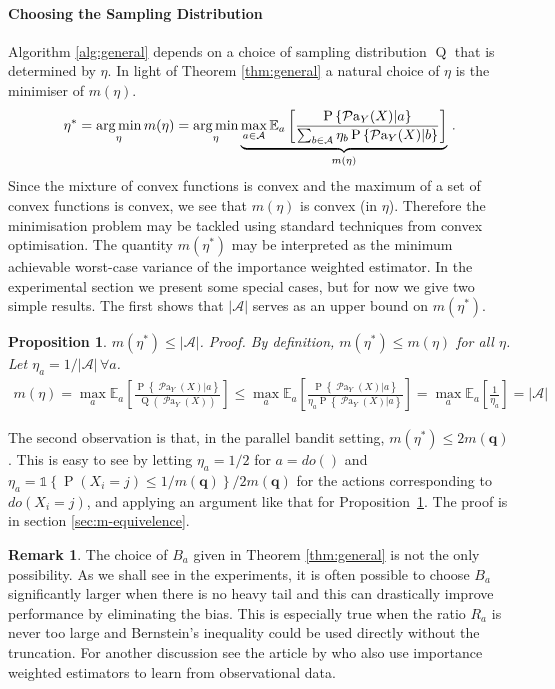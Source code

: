 \documentclass[11pt,a4paper,twoside]{report}
\newcommand{\Q}[1]{\operatorname{Q}\left(#1\right)}
\newcommand{\EE}{\mathbb E}
\newcommand{\EEa}{\EE_a}
\newcommand{\Pn}[2]{\operatorname{P}\left\{#2|#1\right\}}
\newcommand{\calA}{\mathcal A}
\newcommand{\set}[1]{\left\{#1\right\}}
\newcommand{\ind}[1]{\mathds{1}\!\!\set{#1}}
\newcommand{\argmin}{\operatornamewithlimits{arg\,min}}
\newcommand{\eq}[1]{\begin{align*}#1\end{align*}}
\renewcommand{\P}[1]{\operatorname{P}\left(#1\right)}
\newcommand{\parents}[1]{\operatorname{\mathcal{P}a}_{#1}}
\theoremstyle{plain}
\newtheorem{proposition}[theorem]{Proposition}
\theoremstyle{definition}
\newtheorem{remark}[theorem]{Remark}
\begin{document}
\paragraph{Choosing the Sampling Distribution} Algorithm \ref{alg:general} depends on a choice of sampling distribution $\operatorname{Q}$ that is determined by $\eta$. In light of Theorem \ref{thm:general}
a natural choice of $\eta$ is the minimiser of $m(\eta)$.
\eq{
\eta^* 
= \argmin_\eta m(\eta) = \argmin_\eta \underbrace{\max_{a \in \calA} \EEa \left[\frac{\Pn{a}{\parents{Y}(X)}}{\sum_{b \in \calA} \eta_b \Pn{b}{\parents{Y}(X)}}\right]}_{m(\eta)}\,.
}
Since the mixture of convex functions is convex and the maximum of a set of convex functions is convex, we see that $m(\eta)$ is convex (in $\eta$).
Therefore the minimisation problem may be tackled using standard techniques from convex optimisation. The quantity $m(\eta^*)$ may be interpreted as the minimum achievable worst-case variance of the importance weighted estimator. In the experimental section we present some special cases, but for now we give two simple results. The first shows that $|\calA|$ serves as an upper bound on $m(\eta^*)$.

\begin{proposition}\label{pro:m-bound}
$m(\eta^*) \leq |\calA|$. \textit{Proof.} 
\textup{By definition, $m(\eta^*) \leq m(\eta)$ for all $\eta$. Let $\eta_a = 1/|\calA|\,\forall a$.}
\eq{
m(\eta) 
= \max_a \EEa\left[\frac{\Pn{a}{\parents{Y}(X)}}{\Q{\parents{Y}(X)}}\right] 
\leq \max_a \EEa\left[\frac{\Pn{a}{\parents{Y}(X)}}{\eta_a \Pn{a}{\parents{Y}(X)}}\right] 
= \max_a \EEa\left[\frac{1}{\eta_a}\right] = |\calA| %
}
\end{proposition} 

The second observation is that, in the parallel bandit setting, $m(\eta^*) \leq 2m(\boldsymbol{q})$. This is easy to see by letting $\eta_a = 1/2$ for $a = do()$ and $\eta_a = \ind{\P{X_i = j} \leq 1/m(\boldsymbol{q})} / 2m(\boldsymbol{q})$ for the actions corresponding to $do(X_i=j)$, and applying an argument like that for Proposition~\ref{pro:m-bound}. The proof is in section \ref{sec:m-equivelence}.

\begin{remark}\label{rem:truncate}
The choice of $B_a$ given in Theorem \ref{thm:general} is not the only possibility. As we shall see in the experiments, it is 
often possible to choose $B_a$ significantly
larger when there is no heavy tail and this can drastically improve performance by eliminating the bias. This is especially true when the ratio $R_a$ is never too large
and Bernstein's inequality could be used directly without the truncation. For another discussion see the article by \citet{Bottou2013} who also use importance weighted estimators
to learn from observational data.
\end{remark}
\end{document}
